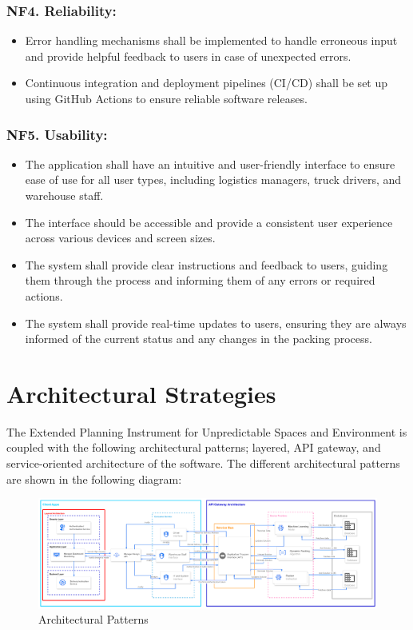 \documentclass[a4paper,12pt]{article}
\begin{document}
\subsubsection*{NF4. Reliability:}
\begin{itemize}
    \item Error handling mechanisms shall be implemented to handle erroneous input and provide helpful feedback to users in case of unexpected errors.
    \item Continuous integration and deployment pipelines (CI/CD) shall be set up using GitHub Actions to ensure reliable software releases.
\end{itemize}

\subsubsection*{NF5. Usability:}
\begin{itemize}
    \item The application shall have an intuitive and user-friendly interface to ensure ease of use for all user types, including logistics managers, truck drivers, and warehouse staff.
    \item The interface should be accessible and provide a consistent user experience across various devices and screen sizes.
    \item The system shall provide clear instructions and feedback to users, guiding them through the process and informing them of any errors or required actions.
    \item The system shall provide real-time updates to users, ensuring they are always informed of the current status and any changes in the packing process.
\end{itemize}

\section{Architectural Strategies}
The Extended Planning Instrument for Unpredictable Spaces and Environment is coupled with the following architectural patterns; layered, API gateway, and service-oriented architecture of the software. The different architectural patterns are shown in the following diagram:

\begin{figure}[h]
    \centering
    \includegraphics[width=\textwidth]{architecturalDiagram.png}
    \caption{Architectural Patterns}
\end{figure}
\end{document}
